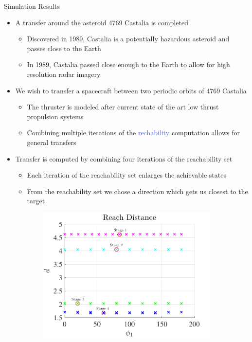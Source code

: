 \documentclass[final, usenames, dvipsnames]{beamer}
\newlength{\onecolwidth}
\def\Emph{\textcolor{RoyalBlue}}
\begin{document}
\begin{frame}[t]
\begin{columns}[T,onlytextwidth]
\begin{column}{\onecolwidth}
\begin{block}{Simulation Results} %
	\begin{itemize}
		\item A transfer around the asteroid 4769 Castalia is completed
        \begin{itemize}
            \item Discovered in 1989, Castalia is a potentially hazardous asteroid and passes close to the Earth
            \item In 1989, Castalia passed close enough to the Earth to allow for high resolution radar imagery
        \end{itemize}
        \item We wish to transfer a spacecraft between two periodic orbits of 4769 Castalia
        \begin{itemize}
            \item The thruster is modeled after current state of the art low thrust propulsion systems
            \item Combining multiple iterations of the \Emph{rechability} computation allows for general transfers
        \end{itemize}
        \item Transfer is computed by combining four iterations of the reachability set
        \begin{itemize}
            \item Each iteration of the reachability set enlarges the achievable states
            \item From the reachability set we chose a direction which gets us closest to the target
        \end{itemize}
    \end{itemize}
    \begin{figure}[htbp] 
        \centering 
        \begin{subfigure}[htbp]{0.3\textwidth} 
            \includegraphics[width=\textwidth]{figures/phi1.pdf} 

\end{subfigure}
\end{figure}
\end{block}
\end{column}
\end{columns}
\end{frame}
\end{document}
